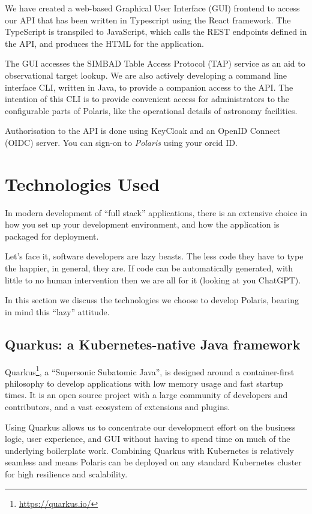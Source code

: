\documentclass[11pt,twoside]{article}
\begin{document}
\clearpage

We have created a web-based Graphical User Interface (GUI) frontend to access our API that has been
written in Typescript using the React framework.
The TypeScript is transpiled to JavaScript, which calls the REST endpoints defined in the API, and produces the
HTML for the application.

The GUI accesses the SIMBAD Table Access Protocol (TAP) service as an aid to observational target lookup.
We are also actively developing a command line interface CLI, written in Java, to provide a companion access to
the API. The intention of this CLI is to provide convenient access for administrators to the configurable parts of
Polaris, like the operational details of astronomy facilities.

Authorisation to the API is done using KeyCloak and an OpenID Connect (OIDC) server.
You can sign-on to \emph{Polaris} using your orcid ID\@.


\section{Technologies Used}\label{sec:technologies-used}

In modern development of ``full stack'' applications, there is an extensive choice in how you set up your
development environment, and how the application is packaged for deployment.

Let's face it, software developers are lazy beasts.
The less code they have to type the happier, in general, they are.
If code can be automatically generated, with little to no human intervention then we are all for it (looking at you
ChatGPT).

In this section we discuss the technologies we choose to develop Polaris, bearing in mind this ``lazy'' attitude.

\subsection{Quarkus: a Kubernetes-native Java framework}\label{subsec:quarkus}

Quarkus\footnote{\url{https://quarkus.io/}}, a ``Supersonic Subatomic Java'', is designed around a
container-first philosophy to develop applications with low memory usage and fast startup times.
It is an open source project with a large community of developers and contributors, and a vast ecosystem
of extensions and plugins.

Using Quarkus allows us to concentrate our development effort on the business logic, user experience, and GUI
without having to spend time on much of the underlying boilerplate work.
Combining Quarkus with Kubernetes is relatively seamless and means Polaris can be deployed on any standard
Kubernetes cluster for high resilience and scalability.
\end{document}
